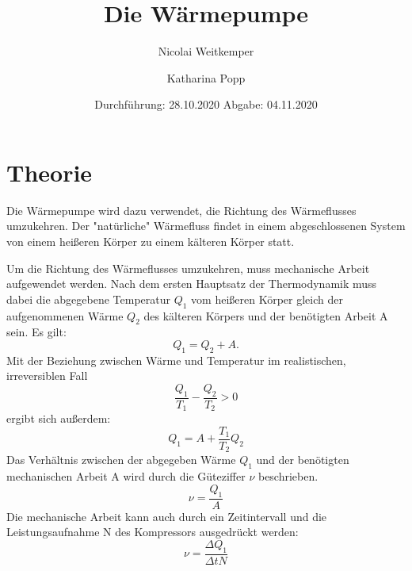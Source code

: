 

\subject{D206}
\title{Die Wärmepumpe}
\author{Nicolai Weitkemper \and Katharina Popp}
\date{
    Durchführung: 28.10.2020
    \hspace{3em}
    Abgabe: 04.11.2020
}


    
\maketitle
\thispagestyle{empty}
\tableofcontents
\newpage

\section{Theorie} \label{sec:Theorie}

    Die Wärmepumpe wird dazu verwendet, die Richtung des Wärmeflusses umzukehren. 
    Der "natürliche" Wärmefluss findet in einem abgeschlossenen System von einem heißeren Körper
    zu einem kälteren Körper statt.

    Um die Richtung des Wärmeflusses umzukehren, muss mechanische Arbeit aufgewendet werden.
    Nach dem ersten Hauptsatz der Thermodynamik muss dabei die abgegebene Temperatur $Q_1$ vom heißeren Körper 
    gleich der aufgenommenen Wärme $Q_2$ des kälteren Körpers und der benötigten Arbeit A sein.
    Es gilt:
    \begin{equation}
        Q_1 = Q_2 + A .
    \end{equation}
    Mit der Beziehung zwischen Wärme und Temperatur im realistischen, irreversiblen Fall
    \begin{equation}
        \frac{Q_1}{T_1} - \frac{Q_2}{T_2} > 0
    \end{equation}
    ergibt sich außerdem:
    \begin{equation}
        Q_1 = A + \frac{T_1}{T_2} Q_2
    \end{equation}
    Das Verhältnis zwischen der abgegeben Wärme $Q_1$ und der benötigten mechanischen Arbeit A wird durch die Güteziffer $\nu$ 
    beschrieben.
    \begin{equation}
        \nu = \frac{Q_1}{A} 
    \end{equation}
    Die mechanische Arbeit kann auch durch ein Zeitintervall und die Leistungsaufnahme N des Kompressors ausgedrückt werden:
    \begin{equation}
        \nu = \frac{\Delta Q_1}{\Delta t N}
    \end{equation}

